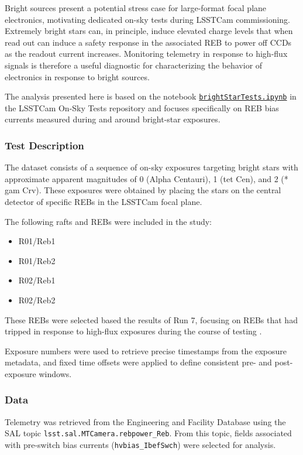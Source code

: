 Bright sources present a potential stress case for large-format focal plane electronics, motivating dedicated on-sky tests during LSSTCam commissioning. Extremely bright stars can, in principle, induce elevated charge levels that when read out can induce a safety response in the associated REB to power off CCDs as the readout current increases. Monitoring telemetry in response to high-flux signals is therefore a useful diagnostic for characterizing the behavior of electronics in response to bright sources.

The analysis presented here is based on the notebook \href{https://github.com/lsst-sitcom/LSSTCam-OnSkyTests/blob/main/notebooks/brightStarTests.ipynb}{\texttt{brightStarTests.ipynb}} in the LSSTCam On-Sky Tests repository and focuses specifically on REB bias currents measured during and around bright-star exposures.

\subsubsection{Test Description}

The dataset consists of a sequence of on-sky exposures targeting bright stars with approximate apparent magnitudes of 0 (Alpha Centauri), 1 (tet Cen), and 2 (* gam Crv). These exposures were obtained by placing the stars on the central detector of specific REBs in the LSSTCam focal plane.

The following rafts and REBs were included in the study:
\begin{itemize}
    \item R01/Reb1
    \item R01/Reb2
    \item R02/Reb1
    \item R02/Reb2
\end{itemize}

These REBs were selected based the results of Run 7, focusing on REBs that had tripped in response to high-flux exposures during the course of testing  \citep{SITCOMTN-148}.

Exposure numbers were used to retrieve precise timestamps from the exposure metadata, and fixed time offsets were applied to define consistent pre- and post-exposure windows.

\subsubsection{Data}

Telemetry was retrieved from the Engineering and Facility Database using the SAL topic \texttt{lsst.sal.MTCamera.rebpower\_Reb}. From this topic, fields associated with pre-switch bias currents (\texttt{hvbias\_IbefSwch}) were selected for analysis. 

